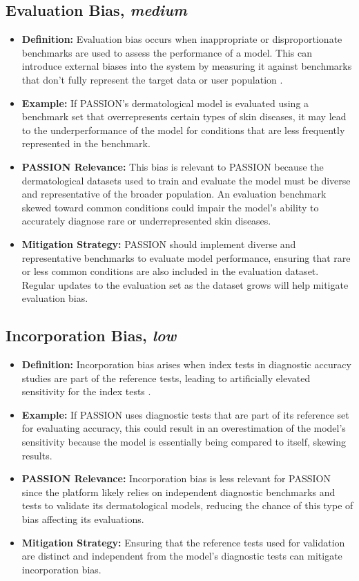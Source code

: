 \begin{refsection}
		\subsection{Evaluation Bias, \textit{medium}}
		\begin{itemize}
			\item \textbf{Definition:} Evaluation bias occurs when inappropriate or disproportionate benchmarks are used to assess the performance of a model. This can introduce external biases into the system by measuring it against benchmarks that don't fully represent the target data or user population \autocites{M144_Suresh_2021}{M24_Buolamwini_2018}.
			\item \textbf{Example:} If PASSION's dermatological model is evaluated using a benchmark set that overrepresents certain types of skin diseases, it may lead to the underperformance of the model for conditions that are less frequently represented in the benchmark.
			\item \textbf{PASSION Relevance:} This bias is relevant to PASSION because the dermatological datasets used to train and evaluate the model must be diverse and representative of the broader population. An evaluation benchmark skewed toward common conditions could impair the model's ability to accurately diagnose rare or underrepresented skin diseases.
			\item \textbf{Mitigation Strategy:} PASSION should implement diverse and representative benchmarks to evaluate model performance, ensuring that rare or less common conditions are also included in the evaluation dataset. Regular updates to the evaluation set as the dataset grows will help mitigate evaluation bias.
		\end{itemize}
		
		\subsection{Incorporation Bias, \textit{low}}
		\begin{itemize}
			\item \textbf{Definition:} Incorporation bias arises when index tests in diagnostic accuracy studies are part of the reference tests, leading to artificially elevated sensitivity for the index tests \autocites{Chakraborty_2024, c21, c25, c26}{Young_2020}.
			\item \textbf{Example:} If PASSION uses diagnostic tests that are part of its reference set for evaluating accuracy, this could result in an overestimation of the model's sensitivity because the model is essentially being compared to itself, skewing results.
			\item \textbf{PASSION Relevance:} Incorporation bias is less relevant for PASSION since the platform likely relies on independent diagnostic benchmarks and tests to validate its dermatological models, reducing the chance of this type of bias affecting its evaluations.
			\item \textbf{Mitigation Strategy:} Ensuring that the reference tests used for validation are distinct and independent from the model's diagnostic tests can mitigate incorporation bias.
		\end{itemize}
		

\end{refsection}
